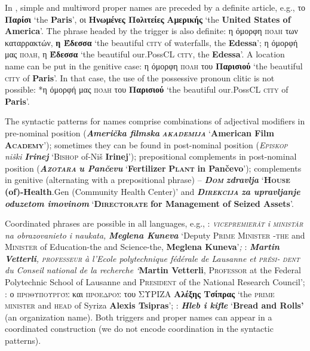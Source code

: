 \documentclass[output=paper]{langsci/langscibook}
\newcommand{\trigger}[1]{\textsc{#1}}
\begin{document}
{{In , simple and multiword proper names are preceded by a definite
article, e.g., το \textbf{Παρίσι} ‘the
\textbf{Paris}’, οι \textbf{Ηνωμένες Πολιτείες}
\textbf{Αμερικής} ‘the \textbf{United States of America}’. The
phrase headed by the trigger is also definite: η όμορφη
\trigger{πόλη} των καταρρακτών, \textbf{η
Έδεσσα} ‘the beautiful \trigger{city} of waterfalls, the
\textbf{Edessa}’; η όμορφή μας \trigger{πόλη},
η \textbf{Έδεσσα} ‘the beautiful our.PossCL \trigger{city}, the
\textbf{Edessa}’. A location name can be put in the genitive case:
η όμορφη \trigger{πόλη} του
\textbf{Παρισιού} ‘the beautiful \trigger{city} of
\textbf{Paris}’. In that case, the use of the possessive pronoun clitic
is not possible: *η όμορφή μας \trigger{πόλη}
του \textbf{Παρισιού} ‘the beautiful our.PossCL
\trigger{city} of \textbf{Paris}’.



The syntactic patterns for  names comprise combinations of
adjectival modifiers in pre-nominal position (\textbf{\textit{Američka
filmska }}\textbf{\textit{\trigger{akademija}}} ‘\textbf{American Film
}\textbf{\trigger{Academy}}’); sometimes they can be found in post-nominal position
(\textit{\trigger{Episkop}} \textit{niški }\textbf{\textit{Irinej}}
‘\trigger{Bishop} of-Niš \textbf{Irinej}’); prepositional complements in
post-nominal position (\textbf{\textit{\trigger{Azotara}}}
\textbf{\textit{u Pančevu}} ‘\textbf{Fertilizer }\textbf{\trigger{Plant}}
\textbf{in Pančevo}’); complements in genitive (alternating with a
prepositional phrase) – \textbf{\textit{\trigger{Dom}}}
\textbf{\textit{zdravlja}} ‘\textbf{\trigger{House}}
\textbf{(of)-Health}.Gen (Community Health Center)’ and
\textbf{\textit{\trigger{Direkcija}}} \textbf{\textit{za upravljanje
oduzetom imovinom}} ‘\textbf{\trigger{Directorate}} \textbf{for
Management of Seized Assets}’.



Coordinated phrases are possible in all languages, e.g., :
\textit{\trigger{vicepremierăt}} \textit{i }\textit{\trigger{ministăr}}
\textit{na obrazovanieto i naukata, }\textbf{\textit{Meglena Kuneva
}}‘Deputy \trigger{Prime Minister} \trigger{-the} and \trigger{Minister} of
Education-the and Science-the, \textbf{Meglena Kuneva}’\textit{; }:
\textbf{\textit{Martin Vetterli}}\textit{, }\textit{\trigger{professeur}}
\textit{à l'Ecole polytechnique fédérale de Lausanne et} \textit{\trigger{prési-}} \textit{\trigger{dent}} \textit{du Conseil national de la recherche
‘}\textbf{Martin Vetterli}, \trigger{Professor} at the Federal
Polytechnic School of Lausanne and \trigger{President} of the National
Research Council’; : ο \trigger{πρωθυπουργός}
και \trigger{πρόεδρος} του ΣΥΡΙΖΑ
\textbf{Αλέξης Τσίπρας} ‘the \trigger{prime minister} and
\trigger{head} of Syriza \textbf{Alexis Tsipras}’; :\textit{
}\textbf{\textit{Hleb i kifle}} ‘\textbf{Bread and Rolls’ }(an
organization name). Both triggers and proper names can appear in a
coordinated construction (we do not encode coordination in the
syntactic patterns).



}}
\end{document}
